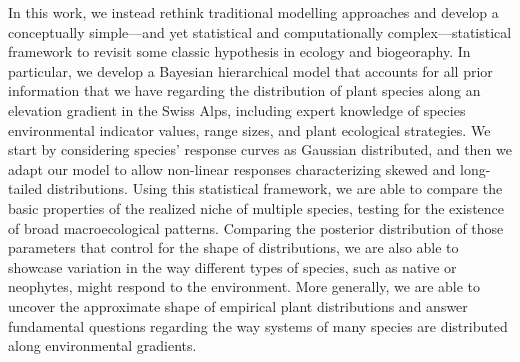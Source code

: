 \documentclass[11pt, a4paper]{article}
\begin{document}
In this work, we instead rethink traditional modelling approaches and develop a conceptually simple---and yet statistical and computationally complex---statistical framework to revisit some classic hypothesis in ecology and biogeoraphy. In particular, we develop a Bayesian hierarchical model that accounts for all prior information that we have regarding the distribution of plant species along an elevation gradient in the Swiss Alps, including expert knowledge of species environmental indicator values, range sizes, and plant ecological strategies. We start by considering species' response curves as Gaussian distributed, and then we adapt our model to allow non-linear responses characterizing skewed and long-tailed distributions. Using this statistical framework, we are able to compare the basic properties of the realized niche of multiple species, testing for the existence of broad macroecological patterns. Comparing the posterior distribution of those parameters that control for the shape of distributions, we are also able to showcase variation in the way different types of species, such as native or neophytes, might respond to the environment. More generally, we are able to uncover the approximate shape of empirical plant distributions and answer fundamental questions regarding the way systems of many species are distributed along environmental gradients.


\end{document}
